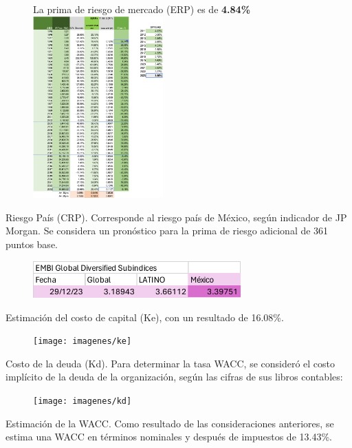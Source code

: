 \begin{figure}[H]
\centering
La prima de riesgo de mercado (ERP) es de \textbf{\textcolor{principal}{4.84\%}} \includegraphics[width=5cm]{imagenes/erp}
\end{figure}

\textcolor{principal}{Riesgo Pa\'is (CRP).} Corresponde al riesgo pa\'is de M\'exico, seg\'un indicador de JP Morgan. Se considera un pron\'ostico para la prima de riesgo adicional de 361 puntos base.

\begin{figure}[H]
\centering
\includegraphics[width=8cm]{imagenes/crp}
\end{figure}

Estimaci\'on del costo de capital (Ke), con un resultado de \textcolor{principal}{16.08\%.}

\begin{figure}[H]
\centering
\texttt{[image: imagenes/ke]}
\end{figure}

\textcolor{principal}{Costo de la deuda (Kd).} Para determinar la tasa WACC, se consider\'o el costo impl\'icito de la deuda de la organizaci\'on, seg\'un las cifras de sus libros contables:

\begin{figure}[H]
\centering
\texttt{[image: imagenes/kd]}
\end{figure}

\newpage

\textcolor{principal}{Estimaci\'on de la WACC}. Como resultado de las consideraciones anteriores, se estima una WACC en t\'erminos nominales y despu\'es de impuestos de 13.43\%.

